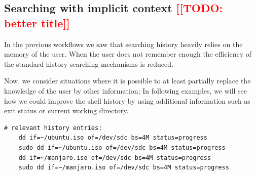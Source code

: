 \documentclass[thesis=M,english]{FITthesis}[2012/10/20]
\newcommand{\redtext}[1]{\textcolor{red}{[[#1]]}}
\begin{document}





\subsection{Searching with implicit context \redtext{TODO: better title}}\label{workflow-search-w-implicit-context}
In the previous workflows we saw that searching history heavily relies on the memory of the user. When the user does not remember enough the efficiency of the standard history searching mechanisms is reduced.

Now, we consider situations where it is possible to at least partially replace the knowledge of the user by other information; In following examples, we will see how we could improve the shell history by using additional information such as exit status or current working directory.

    
    
\begin{verbatim}
# relevant history entries:        
    dd if=~/ubuntu.iso of=/dev/sdc bs=4M status=progress
    sudo dd if=~/ubuntu.iso of=/dev/sdc bs=4M status=progress
    dd if=~/manjaro.iso of=/dev/sdc bs=4M status=progress
    sudo dd if=~/manjaro.iso of=/dev/sdc bs=4M status=progress
\end{verbatim}
\end{document}

